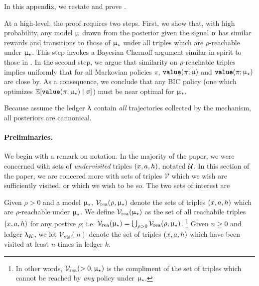 \newcommand{\calV}{\mathcal{V}}
\newcommand{\Vvis}{\calV_{\mathrm{vis}}}
\newcommand{\Vreach}{\calV_{\mathrm{rea}}}
\newcommand{\modtil}{\tilde{\model}}
\newcommand{\valuefrest}[2]{\valuename_{\mathrm{rstr}}(#1;#2)}

In this appendix, we restate and prove .
\proprevelation*

At a high-level, the proof requires two steps. First, we show that, with high probability, any model $\upmu$ drawn from the posterior given the signal $\upsigma$ has similar rewards and transitions to those of $\upmu_{\star}$ under all triples which are $\rho$-reachable under $\upmu_{\star}$. This step invokes a Bayesian Chernoff argument similar in spirit to those in . In the second step, we argue that similarity on $\rho$-reachable triples implies uniformly that for all Markovian policies $\pi$, ${\normalfont \texttt{\textbf{value}}}(\pi;\upmu)$ and ${\normalfont \texttt{\textbf{value}}}(\pi;\upmu_{\star})$ are close by. As a consequence, we conclude that any BIC policy (one which optimizes $\mathbb{E}[{\normalfont \texttt{\textbf{value}}}(\pi;\upmu_{\star}) \mid \upsigma]$) must be near optimal for $\upmu_{\star}$.

\begin{remark} Because assume the ledger $\uplambda$ contain \emph{all} trajectories collected by the mechanism, all posteriors are cannonical.
\end{remark}

\paragraph{Preliminaries.}
We begin with a remark on notation. In the majority of the paper, we were concerned with sets of \emph{undervisited} triples $(x,a,h)$, notated $\mathcal{U}$. In this section of the paper, we are concered more with sets of triples $\calV$ which we wish are sufficiently visited, or which we  wish to be so. The two sets of interest are
\begin{definition} Given $\rho > 0$ and a model $\upmu_{\star}$, $\Vreach(\rho,\modst)$ denote the sets of triples $(x,a,h)$ which are  $\rho$-reachable under $\upmu_{\star}$. We define $\Vreach(\modst)$ as the set of all reachabile triples $(x,a,h)$ for any postive $\rho$; i.e. $\Vreach(\modst) = \bigcup_{\rho > 0}\Vreach(\rho,\modst)$. \footnote{In other words, $\Vreach(>0,\modst)$ is the compliment of the set of triples which cannot be reached by \emph{any} policy under $\upmu_{\star}$.} Given $n \ge 0$ and ledger $\uplambda_K$, we let $\Vvis(n)$ denote the set of triples $(x,a,h)$ which have been visited at least $n$ times in ledger $k$.
\end{definition}

